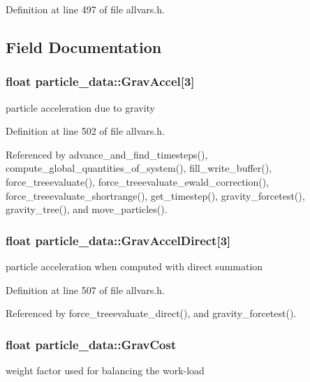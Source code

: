 Definition at line 497 of file allvars.h.



\subsection{Field Documentation}
\hypertarget{structparticle__data_a601ab390c85cd05a5c965e3353d403f3}{
\subsubsection[{GravAccel}]{\setlength{\rightskip}{0pt plus 5cm}float {\bf particle\_\-data::GravAccel}\mbox{[}3\mbox{]}}}
\label{structparticle__data_a601ab390c85cd05a5c965e3353d403f3}
particle acceleration due to gravity 

Definition at line 502 of file allvars.h.



Referenced by advance\_\-and\_\-find\_\-timesteps(), compute\_\-global\_\-quantities\_\-of\_\-system(), fill\_\-write\_\-buffer(), force\_\-treeevaluate(), force\_\-treeevaluate\_\-ewald\_\-correction(), force\_\-treeevaluate\_\-shortrange(), get\_\-timestep(), gravity\_\-forcetest(), gravity\_\-tree(), and move\_\-particles().

\hypertarget{structparticle__data_ae4d6efa44515e66a9b7806d8d57a88bf}{
\subsubsection[{GravAccelDirect}]{\setlength{\rightskip}{0pt plus 5cm}float {\bf particle\_\-data::GravAccelDirect}\mbox{[}3\mbox{]}}}
\label{structparticle__data_ae4d6efa44515e66a9b7806d8d57a88bf}
particle acceleration when computed with direct summation 

Definition at line 507 of file allvars.h.



Referenced by force\_\-treeevaluate\_\-direct(), and gravity\_\-forcetest().

\hypertarget{structparticle__data_a2f34828ae7803611a4e86bb201697317}{
\subsubsection[{GravCost}]{\setlength{\rightskip}{0pt plus 5cm}float {\bf particle\_\-data::GravCost}}}
\label{structparticle__data_a2f34828ae7803611a4e86bb201697317}
weight factor used for balancing the work-\/load 


